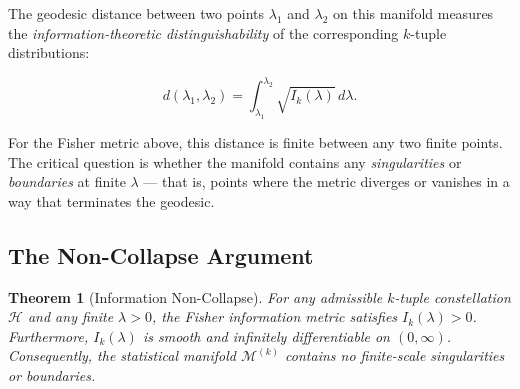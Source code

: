 \documentclass[11pt]{article}
\newtheorem{theorem}{Theorem}[section]
\theoremstyle{remark}
\begin{document}
The geodesic distance between two points $\lambda_1$ and $\lambda_2$ on
this manifold measures the \emph{information-theoretic distinguishability}
of the corresponding $k$-tuple distributions:

\begin{equation}
d(\lambda_1, \lambda_2) = \int_{\lambda_1}^{\lambda_2}
\sqrt{I_k(\lambda)} \, d\lambda.
\end{equation}

For the Fisher metric above, this distance is finite between any two
finite points. The critical question is whether the manifold contains
any \emph{singularities} or \emph{boundaries} at finite $\lambda$ — that
is, points where the metric diverges or vanishes in a way that terminates
the geodesic.

\subsection{The Non-Collapse Argument}

\begin{theorem}[Information Non-Collapse]
\label{thm:non-collapse}
For any admissible $k$-tuple constellation $\mathcal{H}$ and any
finite $\lambda > 0$, the Fisher information metric satisfies
$I_k(\lambda) > 0$. Furthermore, $I_k(\lambda)$ is smooth and
infinitely differentiable on $(0, \infty)$. Consequently, the
statistical manifold $\mathcal{M}^{(k)}$ contains no finite-scale
singularities or boundaries.
\end{theorem}
\end{document}
